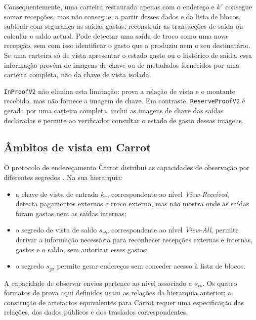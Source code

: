 Consequentemente, uma carteira restaurada apenas com o endereço e \(k^v\)
consegue somar recepções, mas não consegue, a partir desses dados e da lista
de blocos, subtrair com segurança as saídas gastas, reconstruir as transacções
de saída ou calcular o saldo actual. Pode detectar uma saída de troco como
uma nova recepção, sem com isso identificar o gasto que a produziu nem o seu
destinatário. Se uma carteira só de vista apresentar o estado gasto ou o
histórico de saída, essa informação provém de imagens de chave ou de metadados
fornecidos por uma carteira completa, não da chave de vista isolada.

\texttt{InProofV2} não elimina esta limitação: prova a relação de vista e o
montante recebido, mas não fornece a imagem de chave. Em contraste,
\texttt{ReserveProofV2} é gerada por uma carteira completa, inclui as imagens
de chave das saídas declaradas e permite ao verificador consultar o estado de
gasto dessas imagens.

\subsection{Âmbitos de vista em Carrot}
\label{subsec:proofs-carrot-view-tiers}

O protocolo de endereçamento Carrot distribui as capacidades de observação
por diferentes segredos \cite{carrot-specification}. Na sua hierarquia:
\begin{itemize}
 \item a chave de vista de entrada \(k_v\), correspondente ao nível
 \emph{View-Received}, detecta pagamentos externos e troco externo, mas não
 mostra onde as saídas foram gastas nem as saídas internas;

 \item o segredo de vista de saldo \(s_{vb}\), correspondente ao nível
 \emph{View-All}, permite derivar a informação necessária para reconhecer
 recepções externas e internas, gastos e o saldo, sem autorizar esses gastos;

 \item o segredo \(s_{ga}\) permite gerar endereços sem conceder acesso à
 lista de blocos.
\end{itemize}
A capacidade de observar envios pertence ao nível associado a \(s_{vb}\).
Os quatro formatos de prova aqui definidos usam as relações da hierarquia
anterior; a construção de artefactos equivalentes para Carrot requer uma
especificação das relações, dos dados públicos e dos traslados correspondentes.

